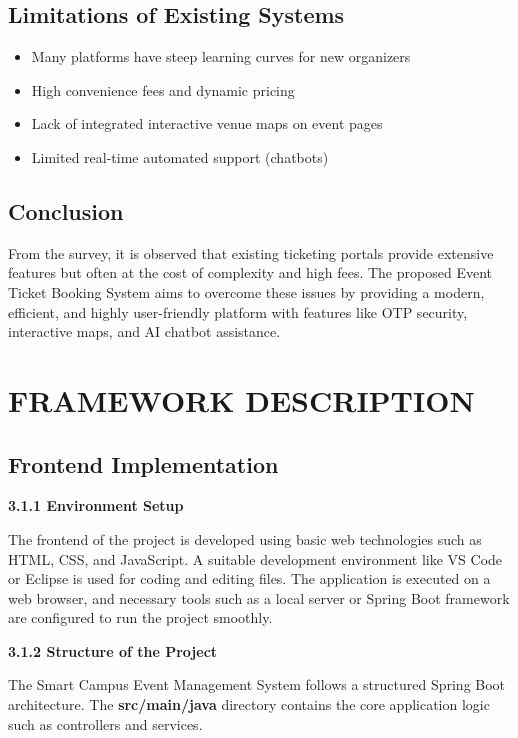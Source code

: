 \documentclass[12pt]{report}
\begin{document}
\section{Limitations of Existing Systems}
\begin{itemize}
\item Many platforms have steep learning curves for new organizers
\item High convenience fees and dynamic pricing
\item Lack of integrated interactive venue maps on event pages
\item Limited real-time automated support (chatbots)
\end{itemize}

\section{Conclusion}
From the survey, it is observed that existing ticketing portals provide extensive features but often at the cost of complexity and high fees. The proposed Event Ticket Booking System aims to overcome these issues by providing a modern, efficient, and highly user-friendly platform with features like OTP security, interactive maps, and AI chatbot assistance.

\chapter{FRAMEWORK DESCRIPTION} 
\linespread{1.5} 

\section{Frontend Implementation} 

\textbf{3.1.1 Environment Setup}

The frontend of the project is developed using basic web technologies such as HTML, CSS, and JavaScript. A suitable development environment like VS Code or Eclipse is used for coding and editing files. The application is executed on a web browser, and necessary tools such as a local server or Spring Boot framework are configured to run the project smoothly. \cite{reactjs}

\textbf{3.1.2 Structure of the Project}

The Smart Campus Event Management System follows a structured Spring Boot architecture. The \textbf{src/main/java} directory contains the core application logic such as controllers and services.
\end{document}
